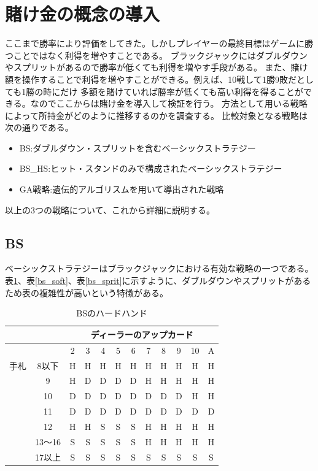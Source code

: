 \section{賭け金の概念の導入}
ここまで勝率により評価をしてきた。しかしプレイヤーの最終目標はゲームに勝つことではなく利得を増やすことである。
ブラックジャックにはダブルダウンやスプリットがあるので勝率が低くても利得を増やす手段がある。
また、賭け額を操作することで利得を増やすことができる。例えば、10戦して1勝9敗だとしても1勝の時にだけ
多額を賭けていれば勝率が低くても高い利得を得ることができる。なのでここからは賭け金を導入して検証を行う。
方法として用いる戦略によって所持金がどのように推移するのかを調査する。
比較対象となる戦略は次の通りである。

\begin{itemize}
  \item BS:ダブルダウン・スプリットを含むベーシックストラテジー
  \item BS_HS:ヒット・スタンドのみで構成されたベーシックストラテジー
  \item GA戦略:遺伝的アルゴリスムを用いて導出された戦略

\end{itemize}

以上の3つの戦略について、これから詳細に説明する。

\subsection{BS}
ベーシックストラテジーはブラックジャックにおける有効な戦略の一つである。
表\ref{bs_hard}、表\ref{bs_soft}、表\ref{bs_sprit}に示すように、ダブルダウンやスプリットがあるため表の複雑性が高いという特徴がある。

\begin{table}[htbp]
  \centering
  \caption{BSのハードハンド\label{bs_hard}}
  \begin{tabular}{|c|c|c|c|c|c|c|c|c|c|c|c|}
    \hline
    \multicolumn{2}{|c|}{} & \multicolumn{10}{|c|}{ディーラーのアップカード} \\ \hline
    \multicolumn{2}{|c|}{} & 2 & 3 & 4 & 5 & 6 & 7 & 8 & 9 & 10 & A \\ \hline
    手札 & 8以下 & H & H & H & H & H & H & H & H & H & H \\ \cline{3-12}
              & 9 & H & D & D & D & D & H & H & H & H & H \\ \cline{3-12}
              & 10 & D & D & D & D & D & D & D & D & H & H \\ \cline{3-12}
              & 11 & D & D & D & D & D & D & D & D & D & D \\ \cline{3-12}
              & 12 & H & H & S & S & S & H & H & H & H & H \\ \cline{3-12}
              & 13～16 & S & S & S & S & S & H & H & H & H & H \\ \cline{3-12}
              & 17以上 & S & S & S & S & S & S & S & S & S & S \\ \hline
  \end{tabular}
\end{table}


